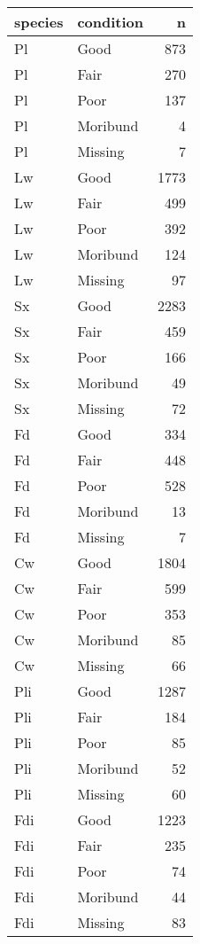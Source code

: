\documentclass[
]{article}
\begin{document}
\begin{tabular}{l|l|r}
\hline
species & condition & n\\
\hline
Pl & Good & 873\\
\hline
Pl & Fair & 270\\
\hline
Pl & Poor & 137\\
\hline
Pl & Moribund & 4\\
\hline
Pl & Missing & 7\\
\hline
Lw & Good & 1773\\
\hline
Lw & Fair & 499\\
\hline
Lw & Poor & 392\\
\hline
Lw & Moribund & 124\\
\hline
Lw & Missing & 97\\
\hline
Sx & Good & 2283\\
\hline
Sx & Fair & 459\\
\hline
Sx & Poor & 166\\
\hline
Sx & Moribund & 49\\
\hline
Sx & Missing & 72\\
\hline
Fd & Good & 334\\
\hline
Fd & Fair & 448\\
\hline
Fd & Poor & 528\\
\hline
Fd & Moribund & 13\\
\hline
Fd & Missing & 7\\
\hline
Cw & Good & 1804\\
\hline
Cw & Fair & 599\\
\hline
Cw & Poor & 353\\
\hline
Cw & Moribund & 85\\
\hline
Cw & Missing & 66\\
\hline
Pli & Good & 1287\\
\hline
Pli & Fair & 184\\
\hline
Pli & Poor & 85\\
\hline
Pli & Moribund & 52\\
\hline
Pli & Missing & 60\\
\hline
Fdi & Good & 1223\\
\hline
Fdi & Fair & 235\\
\hline
Fdi & Poor & 74\\
\hline
Fdi & Moribund & 44\\
\hline
Fdi & Missing & 83\\
\hline
\end{tabular}

\hypertarget{section-20}{%
\paragraph{}\label{section-20}}
\end{document}
